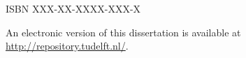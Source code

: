 \begin{titlepage}
\vspace{\bigskipamount}



\noindent
ISBN XXX-XX-XXXX-XXX-X

\medskip
\noindent An electronic version of this dissertation is available at \\
\url{http://repository.tudelft.nl/}.

\end{titlepage}
